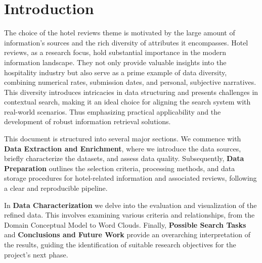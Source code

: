 \documentclass[sigconf]{acmart}
\begin{document}




\maketitle

\section{Introduction}


The choice of the hotel reviews theme is motivated by the large amount of information's sources and the rich diversity of attributes it encompasses. Hotel reviews, as a research focus, hold substantial importance in the modern information landscape. They not only provide valuable insights into the hospitality industry but also serve as a prime example of data diversity, combining numerical rates, submission dates, and personal, subjective narratives. This diversity introduces intricacies in data structuring and presents challenges in contextual search, making it an ideal choice for aligning the search system with real-world scenarios. Thus emphasizing practical applicability and the development of robust information retrieval solutions.

This document is structured into several major sections. We commence with \textbf{Data Extraction and Enrichment}, where we introduce the data sources, briefly characterize the datasets, and assess data quality. Subsequently, \textbf{Data Preparation} outlines the selection criteria, processing methods, and data storage procedures for hotel-related information and associated reviews, following a clear and reproducible pipeline.

In \textbf{Data Characterization} we delve into the evaluation and visualization of the refined data. This involves examining various criteria and relationships, from the Domain Conceptual Model to Word Clouds. Finally, \textbf{Possible Search Tasks} and \textbf{Conclusions and Future Work} provide an overarching interpretation of the results, guiding the identification of suitable research objectives for the project's next phase.
\end{document}
